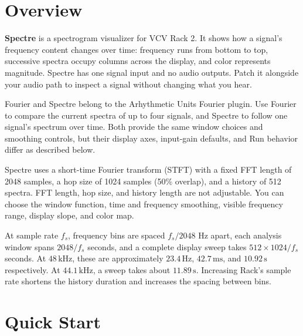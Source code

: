 \documentclass[12pt,letterpaper]{article}
\begin{document}


\section{Overview}

\textbf{Spectre} is a spectrogram visualizer for VCV Rack 2. It shows how a
signal's frequency content changes over time: frequency runs from bottom to
top, successive spectra occupy columns across the display, and color
represents magnitude. Spectre has one signal input and no audio outputs.
Patch it alongside your audio path to inspect a signal without changing what
you hear.

Fourier and Spectre belong to the Arhythmetic Units Fourier plugin. Use
Fourier to compare the current spectra of up to four signals, and Spectre to
follow one signal's spectrum over time. Both provide the same window choices
and smoothing controls, but their display axes, input-gain defaults, and Run
behavior differ as described below.

Spectre uses a short-time Fourier transform (STFT) with a fixed FFT length of
2048 samples, a hop size of 1024 samples (50\% overlap), and a history of 512
spectra. FFT length, hop size, and history length are not adjustable. You can
choose the window function, time and frequency smoothing, visible frequency
range, display slope, and color map.

At sample rate $f_s$, frequency bins are spaced $f_s/2048$ Hz apart, each
analysis window spans $2048/f_s$ seconds, and a complete display sweep takes
$512 \times 1024/f_s$ seconds. At $48\,\mathrm{kHz}$, these are approximately
$23.4\,\mathrm{Hz}$, $42.7\,\mathrm{ms}$, and $10.92\,\mathrm{s}$
respectively. At $44.1\,\mathrm{kHz}$, a sweep takes about
$11.89\,\mathrm{s}$. Increasing Rack's sample rate shortens the history
duration and increases the spacing between bins.

\clearpage
\section{Quick Start}
\end{document}
